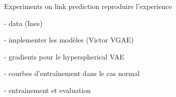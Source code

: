 \begin{frame}{Experiments on link prediction}
    reproduire l'experience 
  
    - data (Ines)
  
    - implementer les modèles (Victor VGAE)
    
    - gradients pour le hyperspherical VAE
    
    - courbes d'entraînement dans le cas normal
  
    - entrainement et evaluation 
  
  \end{frame}